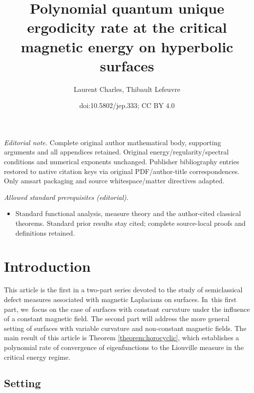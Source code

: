 \documentclass[10pt]{amsart}
\title{Polynomial quantum unique ergodicity rate at the critical magnetic energy on hyperbolic surfaces}
\author{Laurent Charles, Thibault Lefeuvre}
\date{doi:10.5802/jep.333; CC BY 4.0}
\theoremstyle{plain}
\theoremstyle{definition}
\begin{document}
\maketitle
\noindent\textit{Editorial note.} Complete original author mathematical body, supporting arguments and all appendices retained. Original energy/regularity/spectral conditions and numerical exponents unchanged. Publisher bibliography entries restored to native citation keys via original PDF/author-title correspondences. Only amsart packaging and source whitespace/matter directives adapted.\par\medskip
\noindent\textit{Allowed standard prerequisites (editorial).}\begin{itemize}
\item Standard functional analysis, measure theory and the author-cited classical theorems. Standard prior results stay cited; complete source-local proofs and definitions retained.
\end{itemize}\medskip

\tableofcontents


\section{Introduction}

This article is the first in a two-part series devoted to the study of semiclassical defect measures associated with magnetic Laplacians on surfaces. In~this first part, we~focus on the case of surfaces with constant curvature under the influence of a constant magnetic field. The second part \cite{Charles-Lefeuvre-25-2} will address the more general setting of surfaces with variable curvature and non-constant magnetic fields. The main result of this article is Theorem \ref{theorem:horocyclic}, which establishes a polynomial rate of convergence of eigenfunctions to the Liouville measure in the critical energy regime.

\subsection{Setting}
\end{document}
